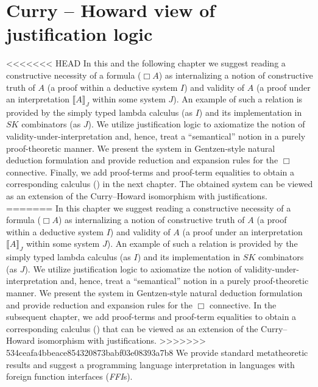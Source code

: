 \chapter{Curry -- Howard view of justification logic}
\label{proposal}
<<<<<<< HEAD
In this and the following chapter
we suggest reading a constructive necessity  
of a formula ($\Box A$) as  internalizing a notion 
of constructive truth of $A$ 
(a proof within a deductive system $I$) 
and validity of $A$
(a proof under an interpretation  $\llbracket A \rrbracket_J$ within some system $J$).  An example of such a relation is provided by the simply typed lambda calculus
(as $I$) 
and its implementation in $SK$ combinators (as $J$). 
We utilize justification logic to axiomatize the notion of 
validity-under-interpretation and, hence, 
treat  a  ``semantical'' notion in a purely
 proof-theoretic manner. We present the system  in 
Gentzen-style  natural deduction formulation  and provide reduction and expansion rules for the $\Box$ connective. Finally, we add proof-terms and proof-term equalities
to obtain a corresponding calculus ({}) in the next chapter.
The obtained system can be viewed as an extension of the Curry--Howard 
isomorphism with justifications.
=======
In this chapter we suggest reading a constructive necessity  of a formula ($\Box A$) as  internalizing a notion of 
constructive truth of $A$ 
(a proof within a deductive system $I$) and validity of $A$
(a proof under an interpretation  $\llbracket A \rrbracket_J$ within some system $J$).  
An example of such a relation is provided by the simply typed lambda calculus
(as $I$) and its implementation in $SK$ combinators (as $J$). 
We utilize justification logic to axiomatize the notion of 
validity-under-interpretation and, hence, treat  a  ``semantical'' notion in a purely proof-theoretic manner. 
We present the system  in 
Gentzen-style  natural deduction formulation  and provide reduction and expansion rules for the $\Box$ connective. 
In the subsequent chapter, we add proof-terms and proof-term equalities
to obtain a corresponding calculus ({}) that can be viewed as an extension of the Curry--Howard isomorphism with justifications.
>>>>>>> 534ceafa4bbeace854320873babf03e08393a7b8
We provide standard metatheoretic results  and suggest a 
programming language  interpretation in  languages with foreign function interfaces (\textit{FFI}s).

